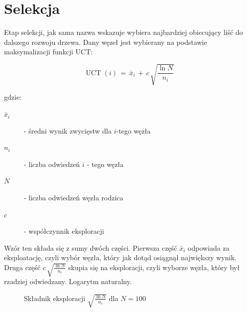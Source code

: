 \section{Selekcja}
Etap selekcji, jak sama nazwa wskazuje wybiera najbardziej obiecujący liść do dalszego rozwoju drzewa.
Dany węzeł jest wybierany na podstawie maksymalizacji funkcji UCT:

\begin{equation}
\operatorname{UCT}(i) \,=\, \bar{x}_i \, + \, c\, \sqrt{\frac{\ln N}{n_i}}\,
\end{equation}

\noindent gdzie:
\begin{description}
  \item[$\bar{x}_i$] - średni wynik zwycięstw dla $i$-tego węzła
  \item[$n_i$] - liczba odwiedzeń $i$ - tego węzła
  \item[$N$] - liczba odwiedzeń węzła rodzica
  \item[$c$] - współczynnik eksploracji
\end{description}

\hspace{1cm}

Wzór ten składa się z sumy dwóch części. Pierwsza część $\bar{x}_i$ odpowiada za eksploatację, czyli wybór węzła, który jak dotąd osiągnął największy wynik. Druga część $c\, \sqrt{\frac{\ln N}{n_i}}$ skupia się na eksploracji, czyli wyborze węzła, który był rzadziej odwiedzany.
Logarytm naturalny.

\begin{figure}[!t]
\centering
{}
\caption{Składnik eksploracji $\sqrt{\frac{\ln N}{n_i}}$ dla $N=100$}
\label{fig:uct-exploration}
\end{figure}


